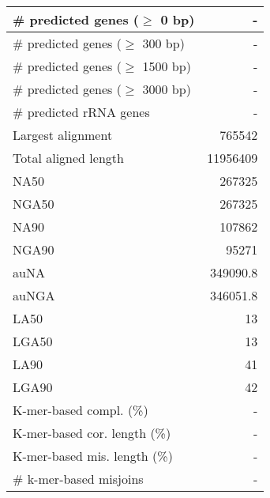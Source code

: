\documentclass[12pt,a4paper]{article}
\begin{document}
\begin{table}[ht]
\begin{center}
\begin{tabular}{|l*{1}{|r}|}
\# predicted genes ($\geq$ 0 bp) & - \\ \hline
\# predicted genes ($\geq$ 300 bp) & - \\ \hline
\# predicted genes ($\geq$ 1500 bp) & - \\ \hline
\# predicted genes ($\geq$ 3000 bp) & - \\ \hline
\# predicted rRNA genes & - \\ \hline
Largest alignment & 765542 \\ \hline
Total aligned length & 11956409 \\ \hline
NA50 & 267325 \\ \hline
NGA50 & 267325 \\ \hline
NA90 & 107862 \\ \hline
NGA90 & 95271 \\ \hline
auNA & 349090.8 \\ \hline
auNGA & 346051.8 \\ \hline
LA50 & 13 \\ \hline
LGA50 & 13 \\ \hline
LA90 & 41 \\ \hline
LGA90 & 42 \\ \hline
K-mer-based compl. (\%) & - \\ \hline
K-mer-based cor. length (\%) & - \\ \hline
K-mer-based mis. length (\%) & - \\ \hline
\# k-mer-based misjoins & - \\ \hline
\end{tabular}
\end{center}
\end{table}
\end{document}
